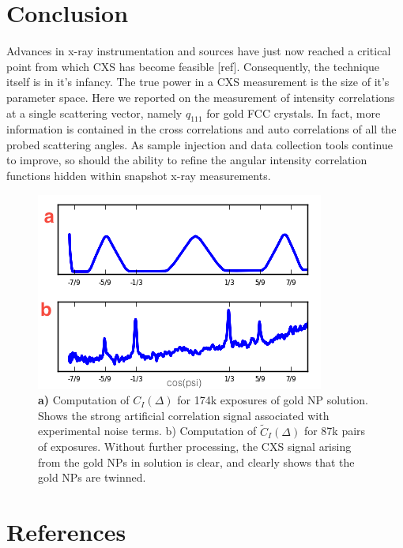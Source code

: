 \documentclass [11pt,fleqn]{article}
\begin{document}
\section{Conclusion}
Advances in x-ray instrumentation and sources have just now reached a critical point from which CXS has become feasible [ref]. Consequently, the technique itself is in it's infancy. The true power in a CXS measurement is the size of it's parameter space. Here we reported on the measurement of intensity correlations at a single scattering vector, namely $q_{111}$ for gold FCC crystals. In fact, more information is contained in the cross correlations and auto correlations of all the probed scattering angles. As sample injection and data collection tools continue to improve, so should the ability to refine the angular intensity correlation functions hidden within snapshot x-ray measurements.

\begin{figure}[h]
\begin{center}
\includegraphics[width=\textwidth,height=\textheight,keepaspectratio]{./raw_dif.png}
\end{center}
\caption{\textbf{a)} Computation of $C_I(\Delta)$ for 174k exposures of gold NP solution. Shows the strong artificial correlation signal associated with experimental noise terms. b) Computation of $\widetilde C_I(\Delta)$ for 87k pairs of exposures. Without further processing, the CXS signal arising from the gold NPs in solution is clear, and clearly shows that the gold NPs are twinned.}
\label{fig:raw_dif}
\end{figure}


\section*{References}
\end{document}
